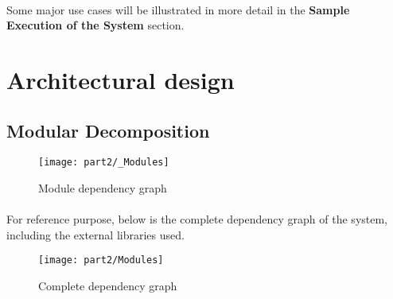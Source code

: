 \documentclass[../gr-final.tex]{subfiles}
\begin{document}
\paragraph{} Some major use cases will be illustrated in more detail in
the {\bfseries Sample Execution of the System} section.


\section{Architectural design}

\subsection{Modular Decomposition}
\begin{figure}[H]
\texttt{[image: part2/\_Modules]}
\caption{Module dependency graph}
\end{figure}
\paragraph{}For reference purpose, below is the complete dependency
graph of the system, including the external libraries used.
\begin{figure}[H]
\texttt{[image: part2/Modules]}
\caption{Complete dependency graph}
\end{figure}
\end{document}
